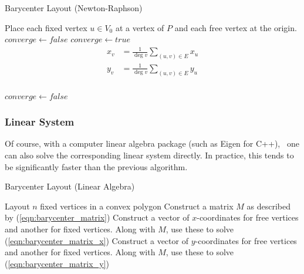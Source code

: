 \documentclass[11pt]{report}
\begin{document}
\begin{algorithm}[H]
    \caption{Barycenter Layout (Newton-Raphson)}
    \begin{algorithmic}[1]
        \State Place each fixed vertex $u \in V_0$ at a vertex of $P$ and each free vertex at the origin.
        \State $converge \gets false$
            \State $converge \gets true$
                \[
                \begin{aligned}
                x_v &= \frac{1}{\deg{v}} \sum_{(u, v) \in E} x_u \\
                y_v &= \frac{1}{\deg{v}} \sum_{(u, v) \in E} y_u \\
                \end{aligned}
                \]
                
                \State {}
                    \State $converge \gets false$
                \EndIf
            \EndFor
        \EndWhile
        \EndProcedure
    \end{algorithmic}
\end{algorithm}

\subsubsection{Linear System}
Of course, with a computer linear algebra package (such as Eigen for C++),~\cite{eigen} one can also solve the corresponding linear system directly. In practice, this tends to be significantly faster than the previous algorithm.

\begin{algorithm}[H]
    \caption{Barycenter Layout (Linear Algebra)}\label{barycenter_la}
    \begin{algorithmic}[1]       
        \State Layout $n$ fixed vertices in a convex polygon
        \State Construct a matrix $M$ as described by (\ref{eqn:barycenter_matrix})
        \State Construct a vector of $x$-coordinates for free vertices and another for fixed vertices. Along with $M$, use these to solve (\ref{eqn:barycenter_matrix_x})
        \State Construct a vector of $y$-coordinates for free vertices and another for fixed vertices. Along with $M$, use these to solve (\ref{eqn:barycenter_matrix_y})
        \EndProcedure
    \end{algorithmic}
\end{algorithm}
\end{document}
